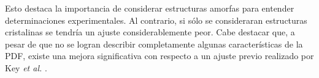 Esto destaca la importancia de considerar estructuras amorfas para entender 
determinaciones experimentales. Al contrario, si sólo se consideraran estructuras
cristalinas se tendría un ajuste considerablemente peor. Cabe destacar que, a 
pesar de que no se logran describir completamente algunas características de la 
PDF, existe una mejora significativa con respecto a un ajuste previo realizado por 
Key \textit{et al.} \cite{key2011}.
\begin{table}[h!]
    \centering
    \caption{Factor de peso de cada contribución (c-Si, c-Li$_{15}$Si$_4$, a-Si y 
    a-Li$_{15}$Si$_4$) a la función distribución radial de a pares $G(r)$ del 
    Si litiado (ver las Figuras \ref{fig:gofrs} y \ref{fig:pdfs} y la ecuación 
    \ref{eq:contributions}). El porcentaje que representa cada peso se agrega entre paréntesis.}
    \setlength\extrarowheight{2pt}
    \label{t:w-gofrs}
\end{table}
